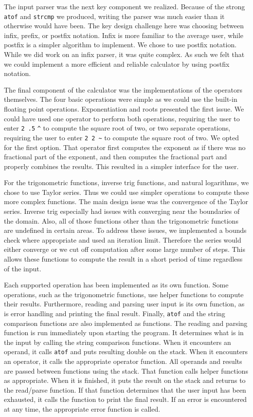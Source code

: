 \documentclass[10pt,letterpaper]{article}
\begin{document}
The input parser was the next key component we realized. Because of the strong
\texttt{atof} and \texttt{strcmp} we produced, writing the parser was much
easier than it otherwise would have been. The key design challenge here was
choosing between infix, prefix, or postfix notation. Infix is more familiar to
the average user, while postfix is a simpler algorithm to implement. We chose to
use postfix notation. While we did work on an infix parser, it was quite
complex. As such we felt that we could implement a more efficient and reliable
calculator by using postfix notation.

The final component of the calculator was the implementations of the operators
themselves. The four basic operations were simple as we could use the built-in
floating point operations. Exponentiation and roots presented the first issue.
We could have used one operator to perform both operations, requiring the user
to enter \texttt{2 .5} \verb|^| to compute the square root of two, or two separate
operations, requiring the user to enter \texttt{2 2 \~} to compute the square
root of two. We opted for the first option. That operator first computes the
exponent as if there was no fractional part of the exponent, and then computes
the fractional part and properly combines the results. This resulted in a
simpler interface for the user.

For the trigonometric functions, inverse trig functions, and natural logarithms,
we chose to use Taylor series. Thus we could use simpler operations to compute
these more complex functions. The main design issue was the convergence of the
Taylor series. Inverse trig especially had issues with converging near the
boundaries of the domain. Also, all of those functions other than the
trigonometric functions are undefined in certain areas. To address these issues,
we implemented a bounds check where appropriate and used an iteration limit.
Therefore the series would either converge or we cut off computation after some
large number of steps. This allows these functions to compute the result in a
short period of time regardless of the input.

Each supported operation has been implemented as its own function. Some
operations, such as the trigonometric functions, use helper functions to compute
their results. Furthermore, reading and parsing user input is its own function,
as is error handling and printing the final result. Finally, \texttt{atof} and
the string comparison functions are also implemented as functions. The reading
and parsing function is run immediately upon starting the program. It determines
what is in the input by calling the string comparison functions. When it
encounters an operand, it calls \texttt{atof} and puts resulting double on the
stack. When it encounters an operator, it calls the appropriate operator
function. All operands and results are passed between functions using the stack.
That function calls helper functions as appropriate. When it is finished, it
puts the result on the stack and returns to the read/parse function. If that
function determines that the user input has been exhausted, it calls the
function to print the final result. If an error is encountered at any time, the
appropriate error function is called.
\end{document}
